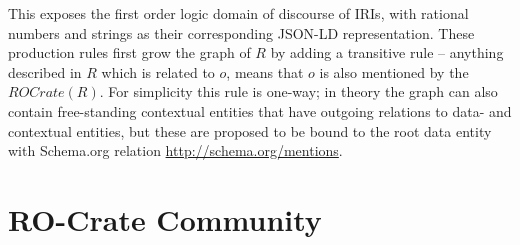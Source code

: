 \documentclass[ds,v1.1.2,openaccess]{iosart2x}%
\begin{document}
\begin{appendix}
This exposes the first order logic domain of discourse of IRIs, with
rational numbers and strings as their corresponding JSON-LD
representation. These production rules first grow the graph of $R$ by
adding a transitive rule -- anything described in $R$ which is related
to $o$, means that $o$ is also mentioned by the $\textit{ROCrate}(R)$. For
simplicity this rule is one-way; in theory the graph can also contain
free-standing contextual entities that have outgoing relations to data-
and contextual entities, but these are proposed to be bound to the root
data entity with Schema.org relation \url{http://schema.org/mentions}.


\section{RO-Crate Community}

\label{sec:communitylist}


\end{appendix}
\end{document}
